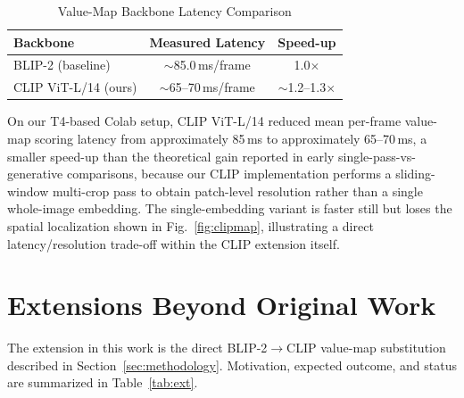 \documentclass[conference]{IEEEtran}
\begin{document}
\begin{table}[t]
\centering
\caption{Value-Map Backbone Latency Comparison}
\label{tab:latency}
\begin{tabular}{@{}lcc@{}}
\toprule
\textbf{Backbone} & \textbf{Measured Latency} & \textbf{Speed-up} \\
\midrule
BLIP-2 (baseline) & $\sim$85.0\,ms/frame & 1.0$\times$ \\
CLIP ViT-L/14 (ours) & $\sim$65--70\,ms/frame & $\sim$1.2--1.3$\times$ \\
\bottomrule
\end{tabular}
\end{table}

On our T4-based Colab setup, CLIP ViT-L/14 reduced mean per-frame value-map scoring latency from approximately 85\,ms to approximately 65--70\,ms, a smaller speed-up than the theoretical gain reported in early single-pass-vs-generative comparisons, because our CLIP implementation performs a sliding-window multi-crop pass to obtain patch-level resolution rather than a single whole-image embedding. The single-embedding variant is faster still but loses the spatial localization shown in Fig.~\ref{fig:clipmap}, illustrating a direct latency/resolution trade-off within the CLIP extension itself.

\section{Extensions Beyond Original Work}
The extension in this work is the direct BLIP-2$\rightarrow$CLIP value-map substitution described in Section~\ref{sec:methodology}. Motivation, expected outcome, and status are summarized in Table~\ref{tab:ext}.

\begin{table}[t]
\centering
\caption{Extension Motivation and Outcome Summary}
\label{tab:ext}
\end{table}
\end{document}
